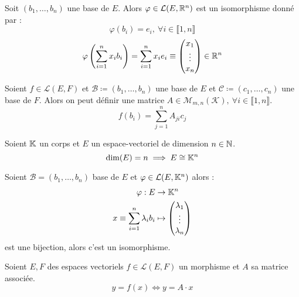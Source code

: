 \begin{corollary}
    Soit $(b_1, \ldots, b_n)$ une base de $E$. Alors $\varphi \in \mathcal{L}(E, \mathbb{R}^n)$ est un isomorphisme donné par :
    \[ \varphi(b_i) = e_i,\ \forall i \in \llbracket 1, n \rrbracket \]
    \[ \varphi \left( \sum_{i = 1}^{n} x_i b_i \right) = \sum_{i = 1}^{n} x_i e_i \equiv 
    \begin{pmatrix}
        x_1 \\
        \vdots \\
        x_n
    \end{pmatrix}
    \in \mathbb{R}^n
     \]
\end{corollary}

\begin{definition}
    Soient $f \in \mathcal{L}(E, F)$ et $\mathcal{B} \coloneqq (b_1, \ldots, b_n)$ une base de $E$ et $\mathcal{C} \coloneqq (c_1, \ldots, c_n)$ une base de $F$.
    Alors on peut définir une matrice $A \in \mathcal{M}_{m,n}(\mathcal{K}),\ \forall i \in \llbracket 1, n \rrbracket$. 
    \[ f(b_i) = \sum_{j = 1}^{n} A_{ji} c_j \]
\end{definition}

\begin{lemma} Soient $\mathbb{K}$ un corps et $E$ un espace-vectoriel de dimension $n \in \mathbb{N}$.
    \[ \dim(E) = n \implies E \cong \mathbb{K}^n \]
\end{lemma}

\begin{lemma}
    Soient $\mathcal{B} = (b_1, \ldots, b_n)$ base de $E$ et $\varphi \in \mathcal{L}(E, \mathbb{K}^n)$  alors :
    \begin{align*}
        \varphi : E &\to \mathbb{K}^n \\
        x \equiv \sum_{i = 1}^{n} \lambda_i b_i &\mapsto 
            \begin{pmatrix}
                \lambda_1 \\
                \vdots \\
                \lambda_n
            \end{pmatrix}
    \end{align*}
    est une bijection, alors c'est un isomorphisme.
\end{lemma}

\begin{proposition}
    Soient $E, F$ des espaces vectoriels $f \in \mathcal{L}(E, F)$ un morphisme et $A$ sa matrice associée. 
    \[ y = f(x) \iff y = A \cdot x \]
\end{proposition}


